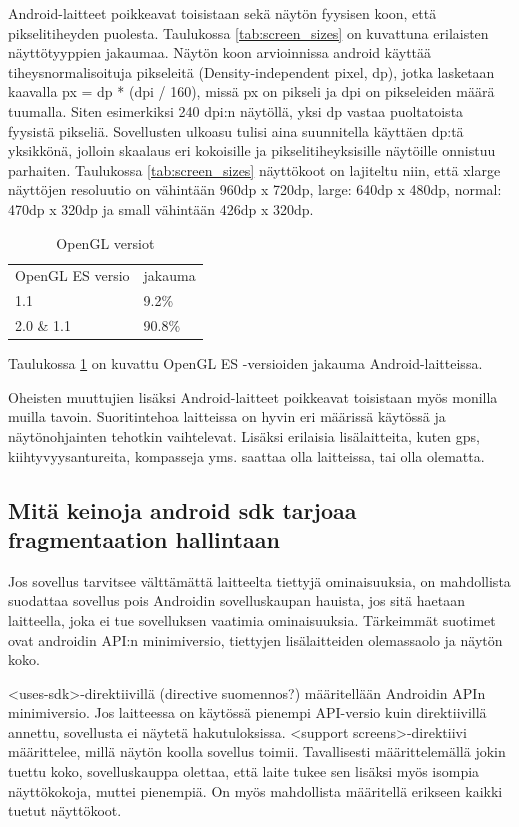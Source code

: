 Android-laitteet poikkeavat toisistaan sekä näytön fyysisen koon, että pikselitiheyden puolesta. Taulukossa \ref{tab:screen_sizes} on kuvattuna erilaisten näyttötyyppien jakaumaa. Näytön koon arvioinnissa android käyttää tiheysnormalisoituja pikseleitä (Density-independent pixel, dp), jotka lasketaan kaavalla px = dp * (dpi / 160), missä px on pikseli ja dpi on pikseleiden määrä tuumalla. Siten esimerkiksi 240 dpi:n näytöllä, yksi dp vastaa puoltatoista fyysistä pikseliä. Sovellusten ulkoasu tulisi aina suunnitella käyttäen dp:tä yksikkönä, jolloin skaalaus eri kokoisille ja pikselitiheyksisille näytöille onnistuu parhaiten. Taulukossa \ref{tab:screen_sizes} näyttökoot on lajiteltu niin, että xlarge näyttöjen resoluutio on vähintään 960dp x 720dp, large: 640dp x 480dp, normal: 470dp x 320dp ja small vähintään 426dp x 320dp.

\begin{table}[h]
\centering
\begin{tabular}{ l l }
  OpenGL ES versio & jakauma \\
  1.1 & 9.2\% \\
  2.0 \& 1.1 & 90.8\% \\
\end{tabular}
\caption{OpenGL versiot}
\label{tab:opengl_versions}
\end{table}

Taulukossa \ref{tab:opengl_versions} on kuvattu OpenGL ES -versioiden jakauma Android-laitteissa.\cite{android_versions}

Oheisten muuttujien lisäksi Android-laitteet poikkeavat toisistaan myös monilla muilla tavoin. Suoritintehoa laitteissa on hyvin eri määrissä käytössä ja näytönohjainten tehotkin vaihtelevat. Lisäksi erilaisia lisälaitteita, kuten gps, kiihtyvyysantureita, kompasseja yms. saattaa olla laitteissa, tai olla olematta.

\subsection{Mitä keinoja android sdk tarjoaa fragmentaation hallintaan}

Jos sovellus tarvitsee välttämättä laitteelta tiettyjä ominaisuuksia, on mahdollista suodattaa sovellus pois Androidin sovelluskaupan hauista, jos sitä haetaan laitteella, joka ei tue sovelluksen vaatimia ominaisuuksia. Tärkeimmät suotimet ovat androidin API:n minimiversio, tiettyjen lisälaitteiden olemassaolo ja näytön koko.

<uses-sdk>-direktiivillä (directive suomennos?) määritellään Androidin APIn minimiversio. Jos laitteessa on käytössä pienempi API-versio kuin direktiivillä annettu, sovellusta ei näytetä hakutuloksissa. <support screens>-direktiivi määrittelee, millä näytön koolla sovellus toimii. Tavallisesti määrittelemällä jokin tuettu koko, sovelluskauppa olettaa, että laite tukee sen lisäksi myös isompia näyttökokoja, muttei pienempiä. On myös mahdollista määritellä erikseen kaikki tuetut näyttökoot.


